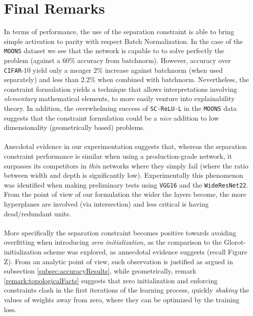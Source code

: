 \section{Final Remarks}\label{sec:finalRemarks}

In terms of performance, the use of the separation constraint is able to bring simple \ReLU activation to parity with respect Batch Normalization. In the case of the \texttt{MOONS} dataset we see that the network is capable to to solve perfectly the problem (against a 60\% accuracy from batchnorm). However, accuracy over \texttt{CIFAR}-10 yield only a meager 2\% increase against batchnorm (when used separately) and less than $2.2$\% when combined with batchnorm. Nevertheless, the constraint formulation yields a technique that allows interpretations involving \emph{elementary} mathematical elements, to more easily venture into explainability theory. In addition, the overwhelming success of \texttt{SC-ReLU-L} in the \texttt{MOONS} data suggests that the constraint formulation could be a \emph{nice} addition to low dimensionality (geometrically based) problems. 
\\\\
Anecdotal evidence in our experimentation suggests that, whereas the separation constraint performance is similar when using a production-grade network, it surpasses its competitors in \emph{thin} networks where they simply fail (where the ratio between width and depth is significantly low). Experimentally this phenomenon was identified when making preliminary tests using \texttt{VGG16} and the \texttt{WideResNet22}. From the point of view of our formulation the wider the layers become, the more hyperplanes are involved (via intersection) and less critical is having dead/redundant units.
\\\\
More specifically the separation constraint becomes positive towards avoiding overfitting when introducing  \emph{zero initialization}, as the comparison to the Glorot-initialization scheme was explored, as annecdotal evidence suggests (recall Figure Z). From an analytic point of view, such observation is justified as argued in subsection \ref{subsec:accuracyResults}, while geometrically, remark \ref{remark:topologicalFacts} suggests that zero initialization and enforcing constraints clash in the first iterations of the learning process, quickly \emph{shaking} the values of  weights away from zero, where they can be optimized by the training loss.
\\\\
